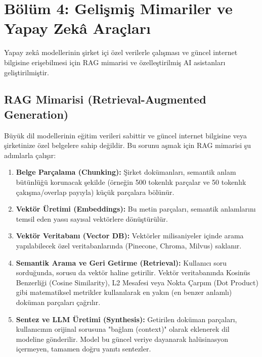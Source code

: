\documentclass[11pt,a4paper,openany]{book}
\begin{document}
\newpage
\section{Bölüm 4: Gelişmiş Mimariler ve Yapay Zekâ Araçları}
Yapay zekâ modellerinin şirket içi özel verilerle çalışması ve güncel internet bilgisine erişebilmesi için RAG mimarisi ve özelleştirilmiş AI asistanları geliştirilmiştir.

\needspace{9cm}
\subsection{RAG Mimarisi (Retrieval-Augmented Generation)}
Büyük dil modellerinin eğitim verileri sabittir ve güncel internet bilgisine veya şirketinize özel belgelere sahip değildir. Bu sorunu aşmak için RAG mimarisi şu adımlarla çalışır:
\begin{enumerate}
    \item \textbf{Belge Parçalama (Chunking):} Şirket dokümanları, semantik anlam bütünlüğü korunacak şekilde (örneğin 500 tokenlık parçalar ve 50 tokenlık çakışma/overlap payıyla) küçük parçalara bölünür.
    \item \textbf{Vektör Üretimi (Embeddings):} Bu metin parçaları, semantik anlamlarını temsil eden yassı sayısal vektörlere dönüştürülür.
    \item \textbf{Vektör Veritabanı (Vector DB):} Vektörler milisaniyeler içinde arama yapılabilecek özel veritabanlarında (Pinecone, Chroma, Milvus) saklanır.
    \item \textbf{Semantik Arama ve Geri Getirme (Retrieval):} Kullanıcı soru sorduğunda, sorusu da vektör haline getirilir. Vektör veritabanında Kosinüs Benzerliği (Cosine Similarity), L2 Mesafesi veya Nokta Çarpım (Dot Product) gibi matematiksel metrikler kullanılarak en yakın (en benzer anlamlı) doküman parçaları çağrılır.
    \item \textbf{Sentez ve LLM Üretimi (Synthesis):} Getirilen doküman parçaları, kullanıcının orijinal sorusuna "bağlam (context)" olarak eklenerek dil modeline gönderilir. Model bu güncel veriye dayanarak halüsinasyon içermeyen, tamamen doğru yanıtı sentezler.
\end{enumerate}

\needspace{9cm}
\end{document}
